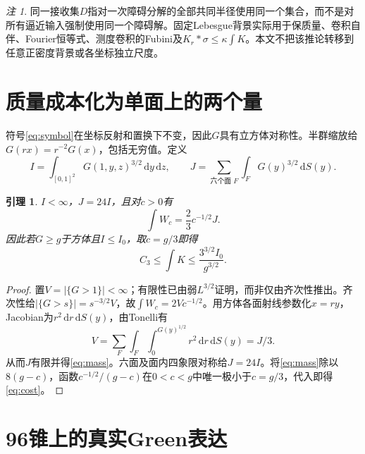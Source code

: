 \documentclass[UTF8,11pt,a4paper,fontset=fandol]{ctexart}
\newtheorem{lemma}[theorem]{引理}
\theoremstyle{definition}\newtheorem{definition}[theorem]{定义}
\theoremstyle{remark}\newtheorem{remark}[theorem]{注}
\newcommand{\dd}{\,\mathrm d}
\newcommand{\abs}[1]{\left|#1\right|}
\begin{document}
\begin{remark}
同一接收集$D$指对一次障碍分解的全部共同半径使用同一个集合，而不是对所有逼近输入强制使用同一个障碍解。固定Lebesgue背景实际用于保质量、卷积自伴、Fourier恒等式、测度卷积的Fubini及$K_r*\sigma\le\kappa\int K$。本文不把该推论转移到任意正密度背景或各坐标独立尺度。
\end{remark}

\section{质量成本化为单面上的两个量}
符号\eqref{eq:symbol}在坐标反射和置换下不变，因此$G$具有立方体对称性。半群缩放给$G(rx)=r^{-2}G(x)$，包括无穷值。定义
\begin{equation}\label{eq:I}
 I=\int_{[0,1]^2}G(1,y,z)^{3/2}\dd y\dd z,
 \qquad J=\sum_{\text{六个面 }F}\int_FG(y)^{3/2}\dd S(y).
\end{equation}
\begin{lemma}\label{lem:mass}
$I<\infty$，$J=24I$，且对$c>0$有
\begin{equation}\label{eq:mass}
 \int W_c=\frac23c^{-1/2}J.
\end{equation}
因此若$G\ge g$于方体且$I\le I_0$，取$c=g/3$即得
\begin{equation}\label{eq:cost}
 C_3\le\int K\le\frac{3^{3/2}I_0}{g^{3/2}}.
\end{equation}
\end{lemma}
\begin{proof}
置$V=\abs{\{G>1\}}<\infty$；有限性已由弱$L^{3/2}$证明，而非仅由齐次性推出。齐次性给$\abs{\{G>s\}}=s^{-3/2}V$，故$\int W_c=2Vc^{-1/2}$。用方体各面射线参数化$x=ry$，Jacobian为$r^2\dd r\dd S(y)$，由Tonelli有
\[
 V=\sum_F\int_F\int_0^{G(y)^{1/2}}r^2\dd r\dd S(y)=J/3.
\]
从而$J$有限并得\eqref{eq:mass}。六面及面内四象限对称给$J=24I$。将\eqref{eq:mass}除以$8(g-c)$，函数$c^{-1/2}/(g-c)$在$0<c<g$中唯一极小于$c=g/3$，代入即得\eqref{eq:cost}。
\end{proof}

\section{96锥上的真实Green表达}
\end{document}
